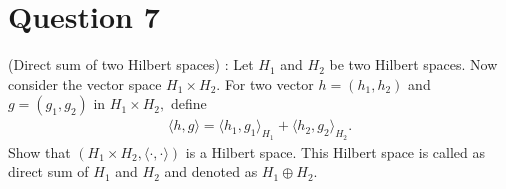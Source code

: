 \section{Question 7}

\horz

(Direct sum of two Hilbert spaces) : Let $H_1$ and $H_2$ be two Hilbert spaces. Now consider the vector space $H_1\times H_2.$ For two vector $h=(h_1,h_2)$ and $g=(g_1,g_2)$ in $H_1\times H_2,$ define
\begin{align*}
\langle h,g\rangle = \langle h_1,g_1\rangle_{H_1} + \langle h_2,g_2\rangle_{H_2}.
\end{align*}
Show that  $(H_1\times H_2, \langle \cdot,\cdot\rangle )$ is a Hilbert space. This Hilbert space is called as direct sum of $H_1$ and $H_2$ and denoted as $H_1\oplus H_2.$ 


\horz
